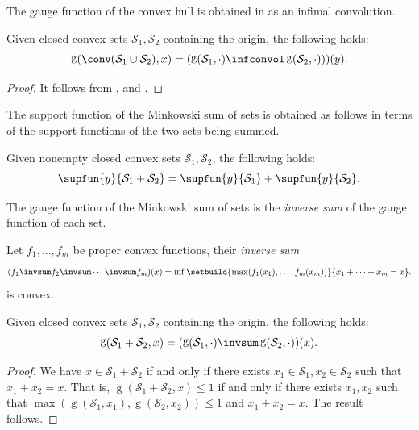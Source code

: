 \documentclass[11pt,twoside,a4paper,openright]{uclouvain-thesis}
\DeclareMathOperator{\gauge}{g}
\begin{document}
The gauge function of the convex hull is obtained in as an infimal convolution.
\begin{myprop}
  \label{prop:gaugeconv}
  Given closed convex sets $\mathcal{S}_1, \mathcal{S}_2$ containing the origin,
  the following holds:
  \[
    \gauge(\conv(\mathcal{S}_1 \cup \mathcal{S}_2), x) = (\gauge(\mathcal{S}_1, \cdot) \infconvol \gauge(\mathcal{S}_2, \cdot)))(y).
  \]
  \begin{proof}
    It follows from ,  and .
  \end{proof}
\end{myprop}

The support function of the Minkowski sum of sets is obtained as follows in terms of the support functions of the two sets being summed.
\begin{myprop}
  \label{prop:supportsum}
  Given nonempty closed convex sets $\mathcal{S}_1, \mathcal{S}_2$,
  the following holds:
  \[
    \supfun{y}{\mathcal{S}_1 + \mathcal{S}_2} = \supfun{y}{\mathcal{S}_1} + \supfun{y}{\mathcal{S}_2}.
  \]
\end{myprop}

The gauge function of the Minkowski sum of sets is
the \emph{inverse sum} of the gauge function of each set.

\begin{myprop}
  Let $f_1, \ldots, f_m$ be proper convex functions,
  their \emph{inverse sum}
  \[ (f_1 \invsum f_2 \invsum \cdots \invsum f_m)(x) = \inf \setbuild{\max(f_1(x_1), \ldots, f_m(x_m))}{x_1 + \cdots + x_m = x}. \]
  is convex.
\end{myprop}

\begin{myprop}
  \label{prop:gaugesum}
  Given closed convex sets $\mathcal{S}_1, \mathcal{S}_2$ containing the origin,
  the following holds:
  \[
    \gauge(\mathcal{S}_1 + \mathcal{S}_2, x) = (\gauge(\mathcal{S}_1, \cdot) \invsum \gauge(\mathcal{S}_2, \cdot))(x).
  \]
  \begin{proof}
    We have $x \in \mathcal{S}_1 + \mathcal{S}_2$ if and only if
    there exists $x_1 \in \mathcal{S}_1, x_2 \in \mathcal{S}_2$ such that $x_1 + x_2 = x$.
    That is, $\gauge(\mathcal{S}_1 + \mathcal{S}_2, x) \le 1$ if and only if
    there exists $x_1, x_2$ such that $\max(\gauge(\mathcal{S}_1, x_1), \gauge(\mathcal{S}_2, x_2)) \le 1$
    and $x_1 + x_2 = x$.
    The result follows.
  \end{proof}
\end{myprop}
\end{document}
